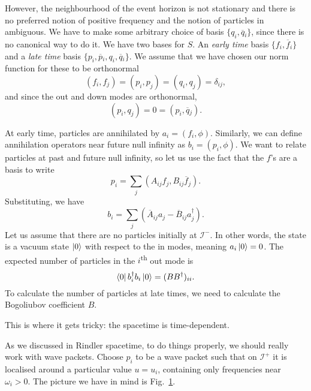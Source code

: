 However, the neighbourhood of the event horizon is not stationary and there is no preferred notion of positive frequency and the notion of particles in ambiguous. We have to make some arbitrary choice of basis $\{q_i, \overline{q}{}_i\}$, since there is no canonical way to do it.
We have two bases for $S$. An \emph{early time} basis $\{f_i, \overline{f}{}_i\}$ and a \emph{late time} basis $\{p_i, \overline{p}{}_i, q_i, \overline{q}{}_i\}$.
We assume that we have chosen our norm function for these to be orthonormal
\begin{equation}
  (f_i, f_j) = (p_i, p_j) = (q_i, q_j) = \delta_{ij},
\end{equation}
and since the out and down modes are orthonormal, 
\begin{equation}
  (p_i, q_j) = 0 = (p_i, \overline{q}{}_j).
\end{equation}

At early time, particles are annihilated by $a_i = (f_i, \phi)$. Similarly, we can define annihilation operators near future null infinity as $b_i = (p_i, \phi)$.
We want to relate particles at past and future null infinity, so let us use the fact that the $f$'s are a basis to write
\begin{equation}
  p_i = \sum_{j} (A_{ij} f_j, B_{ij} \overline{f}{}_j).
\end{equation}
Substituting, we have
\begin{equation}
  b_i = \sum_j (\overline{A}{}_{ij} a_j - \overline{B}{}_{ij} a_j^{\dagger}).
\end{equation}
Let us assume that there are no particles initially at $\mathscr{I}^-$. In other words, the state is a vacuum state $\ket{0}$ with respect to the in modes, meaning $a_i \ket{0} = 0$.
The expected number of particles in the $i$\textsuperscript{th} out mode is
\begin{equation}
  \bra{0} b_i^{\dagger} b_i \ket{0} = (BB^{\dagger})_{ii}.
\end{equation}
To calculate the number of particles at late times, we need to calculate the Bogoliubov coefficient $B$.

This is where it gets tricky: the spacetime is time-dependent.

As we discussed in Rindler spacetime, to do things properly, we should really work with wave packets.
Choose $p_i$ to be a wave packet such that  on $\mathscr{I}^+$ it is localised around a particular value $u = u_i$, containing only frequencies near $\omega_i > 0$.
The picture we have in mind is Fig.~\ref{fig:l22f10}.
\begin{figure}[bthp]
  \centering
  \caption{}
  \label{fig:l22f10}
\end{figure}

